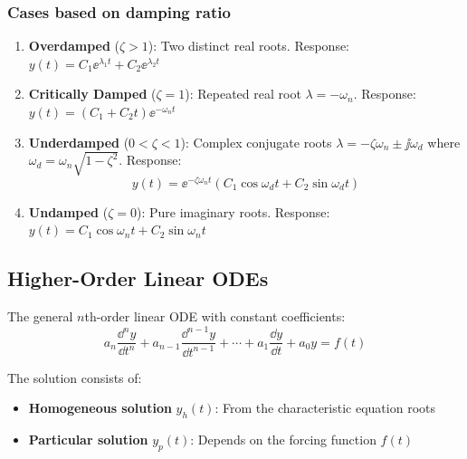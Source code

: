 \subsubsection{Cases based on damping ratio}

\begin{enumerate}
    \item \textbf{Overdamped} ($\zeta > 1$): Two distinct real roots. Response: $y(t) = C_1\ee^{\lambda_1 t} + C_2\ee^{\lambda_2 t}$

    \item \textbf{Critically Damped} ($\zeta = 1$): Repeated real root $\lambda = -\omega_n$. Response: $y(t) = (C_1 + C_2 t)\ee^{-\omega_n t}$

    \item \textbf{Underdamped} ($0 < \zeta < 1$): Complex conjugate roots $\lambda = -\zeta\omega_n \pm \jj\omega_d$ where $\omega_d = \omega_n\sqrt{1-\zeta^2}$. Response:
    \begin{equation}
    y(t) = \ee^{-\zeta\omega_n t}(C_1\cos\omega_d t + C_2\sin\omega_d t)
    \end{equation}

    \item \textbf{Undamped} ($\zeta = 0$): Pure imaginary roots. Response: $y(t) = C_1\cos\omega_n t + C_2\sin\omega_n t$
\end{enumerate}





\subsection{Higher-Order Linear ODEs}

The general $n$th-order linear ODE with constant coefficients:
\begin{equation}
a_n\frac{\dd^n y}{\dd t^n} + a_{n-1}\frac{\dd^{n-1} y}{\dd t^{n-1}} + \cdots + a_1\frac{\dd y}{\dd t} + a_0 y = f(t)
\end{equation}

The solution consists of:
\begin{itemize}
    \item \textbf{Homogeneous solution} $y_h(t)$: From the characteristic equation roots
    \item \textbf{Particular solution} $y_p(t)$: Depends on the forcing function $f(t)$
\end{itemize}


